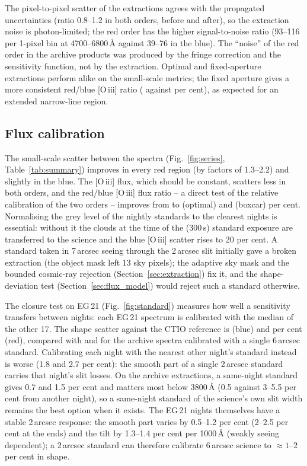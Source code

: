 The pixel-to-pixel scatter of the extractions agrees with the propagated uncertainties (ratio 0.8--1.2 in both
orders, before and after), so the extraction noise is photon-limited; the red order has the higher signal-to-noise
ratio (93--116 per 1-pixel bin at 4700--6800\,\AA{} against 39--76 in the blue). The ``noise'' of the red order in
the archive products was produced by the fringe correction and the sensitivity function, not by the extraction.
Optimal and fixed-aperture extractions perform alike on the small-scale metrics; the fixed aperture gives a more
consistent red/blue [O\,{\sc iii}] ratio (\FRBBox{} against \FRBOpt{} per cent), as expected for an extended
narrow-line region.

\subsection{Flux calibration}
\label{sec:results_flux}
The small-scale scatter between the spectra (Fig.~\ref{fig:series}, Table~\ref{tab:summary}) improves in every red
region (by factors of 1.3--2.2) and slightly in the blue. The [O\,{\sc iii}] flux, which should be constant, scatters
less in both orders, and the red/blue [O\,{\sc iii}] flux ratio -- a direct test of the relative calibration of the two
orders -- improves from \FRBOld{} to \FRBOpt{} (optimal) and \FRBBox{} (boxcar) per cent. Normalising the grey level of
the nightly standards to the clearest nights is essential: without it the clouds at the time of the (300\,s) standard
exposure are transferred to the science and the blue [O\,{\sc iii}] scatter rises to 20 per cent. A standard taken in
7\,arcsec seeing through the 2\,arcsec slit initially gave a broken extraction (the object mask left 13 sky pixels);
the adaptive sky mask and the bounded cosmic-ray rejection (Section~\ref{sec:extraction}) fix it, and the
shape-deviation test (Section~\ref{sec:flux_model}) would reject such a standard otherwise.

The closure test on EG\,21 (Fig.~\ref{fig:standard}) measures how well a sensitivity transfers between nights: each
EG\,21 spectrum is calibrated with the median of the other 17. The shape scatter against the CTIO reference is
\CLbNew{} (blue) and \CLrNew{} per cent (red), compared with \CLbOld{} and \CLrOld{} for the archive spectra calibrated
with a single 6\,arcsec standard. Calibrating each night with the nearest other night's standard instead is worse
(1.8 and 2.7 per cent): the smooth part of a single 2\,arcsec standard carries that night's slit losses. On the
archive extractions, a same-night standard gives 0.7 and 1.5 per cent and matters most below 3800\,\AA{} (0.5 against
3--5.5 per cent from another night), so a same-night standard of the science's own slit width remains the best option
when it exists. The EG\,21 nights themselves have a stable 2\,arcsec response: the smooth part varies by
0.5--1.2 per cent (2--2.5 per cent at the ends) and the tilt by 1.3--1.4 per cent per 1000\,\AA{} (weakly seeing
dependent); a 2\,arcsec standard can therefore calibrate 6\,arcsec science to $\approx1$--2 per cent in shape.

